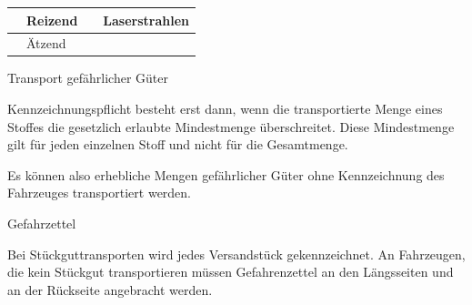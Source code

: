 \documentclass{article}
\begin{document}
\begin{center}
\begin{tabular}{|m{3.225cm}m{3.225cm}|m{3.225cm}m{3.225cm}|}
 &
Reizend

 &
\centering   [Warning: Image ignored]
 \par

 &
Laserstrahlen

\\\hline
\centering   [Warning: Image ignored]
 \par

 &
\"Atzend

 &
 &
\\\hline
\end{tabular}
\end{center}
Transport gef\"ahrlicher G\"uter

Kennzeichnungspflicht besteht erst dann, wenn die transportierte Menge
eines Stoffes die gesetzlich erlaubte Mindestmenge \"uberschreitet.
Diese Mindestmenge gilt f\"ur jeden einzelnen Stoff und nicht f\"ur die
Gesamtmenge.

Es k\"onnen also erhebliche Mengen gef\"ahrlicher G\"uter ohne
Kennzeichnung des Fahrzeuges transportiert werden. 

Gefahrzettel

Bei St\"uckguttransporten wird jedes Versandst\"uck gekennzeichnet. An
Fahrzeugen, die kein St\"uckgut transportieren m\"ussen Gefahrenzettel
an den L\"angsseiten und an der R\"uckseite angebracht werden.
\end{document}
